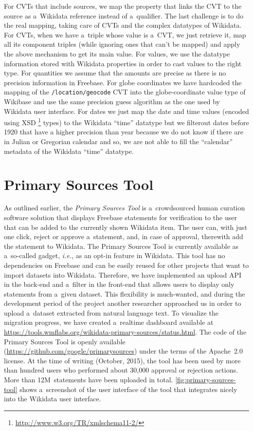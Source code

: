 \documentclass{sig-alternate}
\begin{document}
For CVTs that include sources, we map the property that links the CVT
to the source as a~Wikidata reference instead of a~qualifier.
The last challenge is to do the real mapping, taking care of CVTs
and the complex datatypes of Wikidata.
For CVTs, when we have a~triple whose value is a~CVT, we just retrieve it,
map all its component triples (while ignoring ones that can't be mapped)
and apply the above mechanism to get its main value.
For values, we use the datatype information stored with Wikidata properties
in order to cast values to the right type.
For quantities we assume that the amounts are precise
as there is no precision information in Freebase.
For globe coordinates we have hardcoded the mapping of the \texttt{/location/geocode} CVT
into the globe-coordinate value type of Wikibase
and use the same precision guess algorithm as the one used by Wikidata user interface.
For dates we just map the date and time values (encoded using XSD%
\footnote{\url{ http://www.w3.org/TR/xmlschema11-2/}} types)
to the Wikidata ``time'' datatype but we filterout dates before 1920 that have
a higher precision than year because we do not know
if there are in Julian or Gregorian calendar and so,
we are not able to fill the ``calendar'' metadata of the Wikidata ``time'' datatype.

\section{Primary Sources Tool}\label{sec:primary-sources-tool}

As outlined earlier, the \emph{Primary Sources Tool} is a~crowdsourced human curation
software solution that displays Freebase statements
for verification to the user that can be added to the currently shown Wikidata item.
The user can, with just one click, reject or approve a~statement,
and, in case of approval, therewith add the statement to Wikidata.
The Primary Sources Tool is currently available as a~so-called gadget,
\emph{i.e.}, as an opt-in feature in Wikidata.
This tool has no dependencies on Freebase and can be easily reused for other projects
that want to import datasets into Wikidata.
Therefore, we have implemented an upload API in the back-end
and a~filter in the front-end that allows users to display only statements from a~given dataset.
This flexibility is much-wanted, and during the development period of the project
another researcher approached us in order to upload a~dataset extracted from natural language text.
To visualize the migration progress, we have created a~realtime dashboard
available at \url{https://tools.wmflabs.org/wikidata-primary-sources/status.html}.
The code of the Primary Sources Tool is openly available
(\url{https://github.com/google/primarysources}) under the terms of the Apache~2.0 license.
At the time of writing (October, 2015), the tool has been used by more than hundred users
who performed about 30,000 approval or rejection actions.
More than 12M~statements have been uploaded in total.
\autoref{fig:primary-sources-tool} shows a~screenshot of the user interface
of the tool that integrates nicely into the Wikidata user interface.
\end{document}
